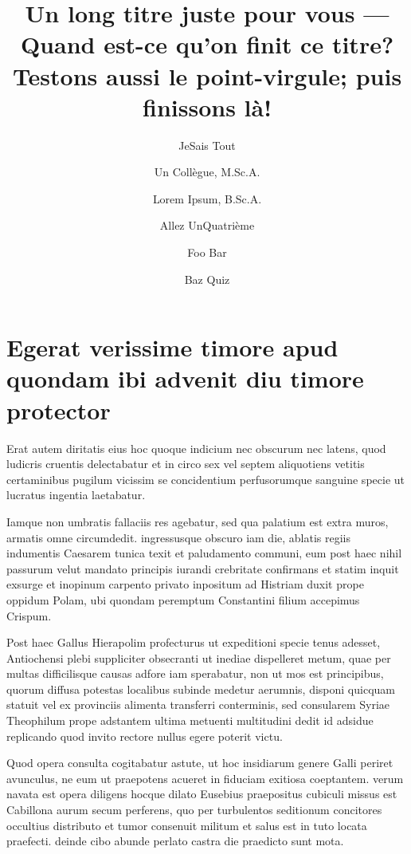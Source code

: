 ﻿\documentclass{SchoolReport}
\title{Un long titre juste pour vous --- Quand est-ce qu’on finit ce titre? Testons aussi le point-virgule; puis finissons là!}
\author{JeSais Tout \and Un Collègue, M.Sc.A. \and Lorem Ipsum, B.Sc.A. \and Allez UnQuatrième \and Foo Bar \and Baz Quiz}
\begin{document}
\tableofcontents
\listoftables
\listoffigures


\body
\chapter{Egerat verissime timore apud quondam ibi advenit diu timore protector}
Erat autem diritatis eius hoc quoque indicium nec obscurum nec latens, quod ludicris cruentis delectabatur et in circo sex vel septem aliquotiens vetitis certaminibus pugilum vicissim se concidentium perfusorumque sanguine specie ut lucratus ingentia laetabatur.

Iamque non umbratis fallaciis res agebatur, sed qua palatium est extra muros, armatis omne circumdedit. ingressusque obscuro iam die, ablatis regiis indumentis Caesarem tunica texit et paludamento communi, eum post haec nihil passurum velut mandato principis iurandi crebritate confirmans et statim inquit exsurge et inopinum carpento privato inpositum ad Histriam duxit prope oppidum Polam, ubi quondam peremptum Constantini filium accepimus Crispum.

Post haec Gallus Hierapolim profecturus ut expeditioni specie tenus adesset, Antiochensi plebi suppliciter obsecranti ut inediae dispelleret metum, quae per multas difficilisque causas adfore iam sperabatur, non ut mos est principibus, quorum diffusa potestas localibus subinde medetur aerumnis, disponi quicquam statuit vel ex provinciis alimenta transferri conterminis, sed consularem Syriae Theophilum prope adstantem ultima metuenti multitudini dedit id adsidue replicando quod invito rectore nullus egere poterit victu.

Quod opera consulta cogitabatur astute, ut hoc insidiarum genere Galli periret avunculus, ne eum ut praepotens acueret in fiduciam exitiosa coeptantem. verum navata est opera diligens hocque dilato Eusebius praepositus cubiculi missus est Cabillona aurum secum perferens, quo per turbulentos seditionum concitores occultius distributo et tumor consenuit militum et salus est in tuto locata praefecti. deinde cibo abunde perlato castra die praedicto sunt mota.
\end{document}
